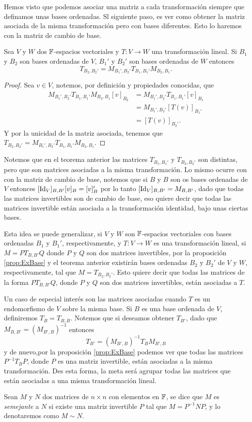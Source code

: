 Hemos visto que podemos asociar una matriz a cada transformación siempre que definamos unas bases ordenadas. Sl siguiente paso, es ver como obtener la matriz asociada de la misma transformación pero con bases diferentes. Esto lo haremos con la matriz de cambio de base.

\begin{teor}
  Sea $V$ y $W$ dos $\mathbb{F}$-espacios vectoriales y $T \colon V \to W$ una transformación lineal. Si $B_1$ y $B_2$ son bases ordenadas de $V$, $B_1'$ y $B_2'$ son bases ordenadas de $W$ entonces
  \[T_{B_2,B_2'} = M_{B_1', B_2'} T_{B_1,B_1'}M_{B_2,B_1}. \]
\end{teor}
\begin{proof}
  Sea $v \in V$, notemos, por definición y propiedades conocidas, que
  \begin{align*}
    M_{B_1', B_2'} T_{B_1,B_1'}M_{B_2,B_1} [v]_{B_2} &= M_{B_1', B_2'} T_{B_1,B_1'} [v]_{B_1} \\
      &= M_{B_1', B_2'} [T(v)]_{B_1'} \\
      &= [T(v)]_{B_2'}.
  \end{align*}
  Y por la unicidad de la matriz asociada, tenemos que $T_{B_2,B_2'} = M_{B_1', B_2'} T_{B_1,B_1'}M_{B_2,B_1}$.
\end{proof}

Notemos que en el teorema anterior las matrices $T_{B_1,B_1'}$ y $T_{B_2,B_2'}$ son distintas, pero que son matrices asociadas a la misma transformación. Lo mismo ocurre con con la matriz de cambio de base, notemos que si $B$ y $B$ son os bases ordenadas de $V$ entonces $[\mathrm{Id}_V]_{B,B'}[v]_B = [v]_B'$ por lo tanto $[\mathrm{Id}_V]_{B,B'} = M_{B,B'}$, dado que todas las matrices invertibles son de cambio de base, eso quiere decir que todas las matrices invertible están asociada a la transformación identidad, bajo unas ciertas bases.

Esta idea se puede generalizar, si $V$ y $W$ son $\mathbb{F}$-espacios vectoriales con bases ordenadas $B_1$ y $B_1'$, respectivamente, y $T\colon V \to W$ es una transformación lineal, si $M = PT_{B,B'}Q$ donde $P$ y $Q$ son dos matrices invertibles, por la proposición \ref{prop:ExBase} y el teorema anterior existirán bases ordenadas $B_2$ y $B_2'$ de $V$ y $W$, respectivamente, tal que $M = T_{B_2, B_2'}$. Esto quiere decir que todas las matrices de la forma $PT_{B,B'}Q$, donde $P$ y $Q$ son dos matrices invertibles, están asociadas a $T$.

Un caso de especial interés son las matrices asociadas cuando $T$ es un endomorfismo de $V$ sobre la misma base. Si $B$ es una base ordenada de $V$, definiremos $T_B = T_{B,B}$. Notemos que si deseamos obtener $T_{B'}$, dado que $M_{B,B'} = (M_{B',B})^{-1}$ entonces 
  \[ T_{B'} = (M_{B',B})^{-1} T_B M_{B',B} \]
y de nuevo,por la proposición \ref{prop:ExBase} podemos ver que todas las matrices $P^{-1}T_{B}P$, donde $P$ es una matriz invertible, están asociadas a la misma transformación. Des esta forma, la meta será agrupar todas las matrices que están asociadas a una misma transformación lineal.

\begin{defi}
  Sean $M$ y $N$ dos matrices de $n \times n$ con elementos en $\mathbb{F}$, se dice que $M$ es \emph{semejante} a $N$ si existe una matriz invertible $P$ tal que $M = P^{-1}NP$, y lo denotaremos como $M \sim N$.
\end{defi}
